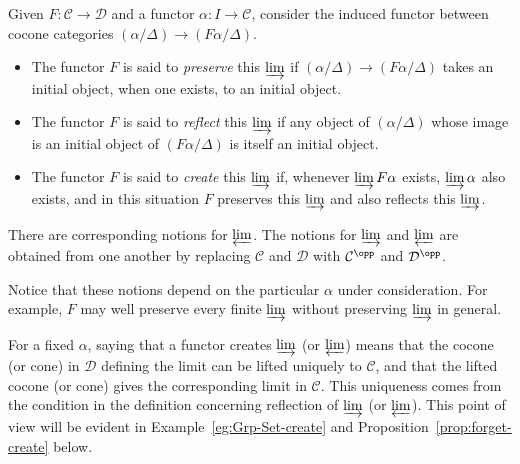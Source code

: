 \begin{definition}\label{def:create-limit}
	Given $F: \mathcal{C} \to \mathcal{D}$ and a functor
	$\alpha: I \to \mathcal{C}$, consider the induced functor between cocone
	categories $(\alpha/\Delta) \to (F\alpha/\Delta)$.
	\begin{itemize}
		\item The functor $F$ is said to \emph{preserve} this $\varinjlim$ if
		$(\alpha/\Delta) \to (F\alpha/\Delta)$ takes an initial object, when
		one exists, to an initial object.
		\item The functor $F$ is said to \emph{reflect} this $\varinjlim$ if any
		object of $(\alpha/\Delta)$ whose image is an initial object of
		$(F\alpha/\Delta)$ is itself an initial object.
	\item The functor $F$ is said to \emph{create} this $\varinjlim$ if,
	whenever $\varinjlim F\alpha$ exists, $\varinjlim \alpha$ also exists,
	and in this situation $F$ preserves this $\varinjlim$ and also reflects
	this $\varinjlim$.
	\end{itemize}
	There are corresponding notions for $\varprojlim$. The notions for
	$\varinjlim$ and $\varprojlim$ are obtained from one another by replacing
	$\mathcal{C}$ and $\mathcal{D}$ with $\mathcal{C}^{\opp}$ and
	$\mathcal{D}^{\opp}$.
\end{definition}

Notice that these notions depend on the particular $\alpha$ under
consideration. For example, $F$ may well preserve every finite
$\varinjlim$ without preserving $\varinjlim$ in general.

For a fixed $\alpha$, saying that a functor creates $\varinjlim$ (or
$\varprojlim$) means that the cocone (or cone) in $\mathcal{D}$ defining the
limit can be lifted uniquely to $\mathcal{C}$, and that the lifted cocone (or
cone) gives the corresponding limit in $\mathcal{C}$. This uniqueness comes
from the condition in the definition concerning reflection of $\varinjlim$
(or $\varprojlim$). This point of view will be evident in
Example~\ref{eg:Grp-Set-create} and Proposition~\ref{prop:forget-create} below.

